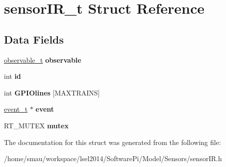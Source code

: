 \hypertarget{structsensorIR__t}{\section{sensor\-I\-R\-\_\-t Struct Reference}
\label{structsensorIR__t}
}
\subsection*{Data Fields}
\begin{DoxyCompactItemize}
\item 
\hypertarget{structsensorIR__t_ae0c0db6106805970225367a0175a39b5}{\hyperlink{structobservable__t}{observable\-\_\-t} {\bfseries observable}}\label{structsensorIR__t_ae0c0db6106805970225367a0175a39b5}

\item 
\hypertarget{structsensorIR__t_adbad74faf657c5ef7ac22d1e3e734377}{int {\bfseries id}}\label{structsensorIR__t_adbad74faf657c5ef7ac22d1e3e734377}

\item 
\hypertarget{structsensorIR__t_a9886b7dba3785c957f73b516773eaa13}{int {\bfseries G\-P\-I\-Olines} \mbox{[}M\-A\-X\-T\-R\-A\-I\-N\-S\mbox{]}}\label{structsensorIR__t_a9886b7dba3785c957f73b516773eaa13}

\item 
\hypertarget{structsensorIR__t_a329e8abca6efc7aca48d9bf8ffe1f9ea}{\hyperlink{structevent__t}{event\-\_\-t} $\ast$ {\bfseries event}}\label{structsensorIR__t_a329e8abca6efc7aca48d9bf8ffe1f9ea}

\item 
\hypertarget{structsensorIR__t_a561619406caa4457bde42f22a047de93}{R\-T\-\_\-\-M\-U\-T\-E\-X {\bfseries mutex}}\label{structsensorIR__t_a561619406caa4457bde42f22a047de93}

\end{DoxyCompactItemize}


The documentation for this struct was generated from the following file\-:\begin{DoxyCompactItemize}
\item 
/home/smau/workspace/lsel2014/\-Software\-Pi/\-Model/\-Sensors/sensor\-I\-R.\-h\end{DoxyCompactItemize}
